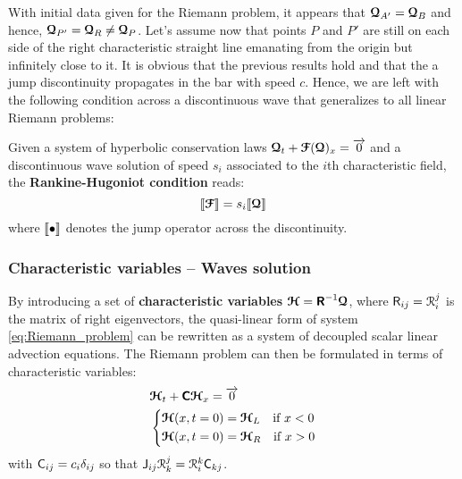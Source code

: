 With initial data given for the Riemann problem, it appears that ${\boldsymbol{\mathcal{Q}}}_{A'}={\boldsymbol{\mathcal{Q}}}_{B}$ and hence, ${\boldsymbol{\mathcal{Q}}}_{P'}={\boldsymbol{\mathcal{Q}}}_{R} \ne {\boldsymbol{\mathcal{Q}}}_{P}$. Let's assume now that points $P$ and $P'$ are still on each side of the right characteristic straight line emanating from the origin but infinitely close to it. It is obvious that the previous results hold and that the a jump discontinuity propagates in the bar with speed $c$. Hence, we are left with the following condition across a discontinuous wave \cite{Toro} that generalizes to all linear Riemann problems:
\begin{definition}
Given a system of hyperbolic conservation laws ${\boldsymbol{\mathcal{Q}}}_t + {\boldsymbol{\mathcal{F}}}({\boldsymbol{\mathcal{Q}}})_x={\overrightarrow{0}}$ and a discontinuous wave solution of speed $s_i$ associated to the $i$th characteristic field, the \textbf{Rankine-Hugoniot condition} reads:
\begin{equation}
  \label{eq:rankine-hugoniot}
  \llbracket  {\boldsymbol{\mathcal{F}}} \rrbracket = s_i \llbracket  {\boldsymbol{\mathcal{Q}}} \rrbracket
\end{equation}
where $\llbracket \bullet \rrbracket$ denotes the jump operator across the discontinuity.  
\end{definition}

\subsubsection*{Characteristic variables -- Waves solution}
By introducing a set of \textbf{characteristic variables} ${\boldsymbol{\mathcal{H}}}=\boldsymbol{\mathsf{R}}^{-1}{\boldsymbol{\mathcal{Q}}}$, where $\mathsf{R}_{ij}=\mathcal{R}^j_i$ is the matrix of right eigenvectors, the quasi-linear form of system \eqref{eq:Riemann_problem} can be rewritten as a system of decoupled scalar linear advection equations.
The Riemann problem can then be formulated in terms of characteristic variables:
\begin{equation*}
  \begin{aligned}
    &{\boldsymbol{\mathcal{H}}}_t + \boldsymbol{\mathsf{C}}{\boldsymbol{\mathcal{H}}}_x = {\overrightarrow{0}} \\
    &\left\lbrace 
      \begin{aligned}
        & {\boldsymbol{\mathcal{H}}}(x,t=0) = {\boldsymbol{\mathcal{H}}}_L \quad \text{if } x< 0\\
        & {\boldsymbol{\mathcal{H}}}(x,t=0) = {\boldsymbol{\mathcal{H}}}_R \quad \text{if } x> 0
      \end{aligned}
    \right.
  \end{aligned}
\end{equation*}
with $\mathsf{C}_{ij}=c_i\delta_{ij}$ so that $\mathsf{J}_{ij} \mathcal{R}^j_k = \mathcal{R}^k_i\mathsf{C}_{kj}$. 

